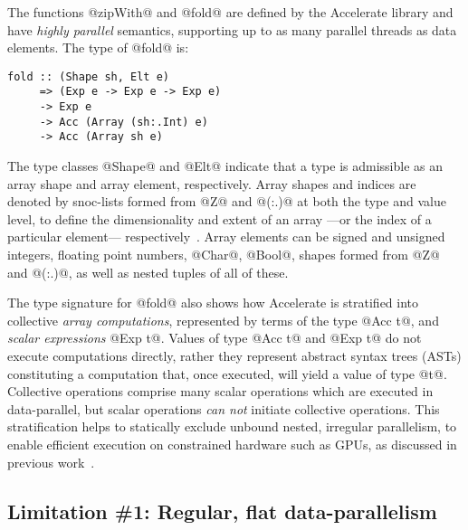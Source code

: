 The functions @zipWith@ and @fold@ are defined by the Accelerate library and
have \emph{highly parallel} semantics, supporting up to as many parallel threads as
data elements. The type of @fold@ is:
%
\begin{lstlisting}
fold :: (Shape sh, Elt e)
     => (Exp e -> Exp e -> Exp e)
     -> Exp e
     -> Acc (Array (sh:.Int) e)
     -> Acc (Array sh e)
\end{lstlisting}
%
The type classes @Shape@ and @Elt@ indicate that a type is admissible as an
array shape and array element, respectively. Array shapes and indices are
denoted by snoc-lists formed from @Z@ and @(:.)@ at both the type and value
level, to define the dimensionality and extent of an array ---or the index of a
particular element--- respectively~\citep{Keller:Repa,Chakravarty:acc-cuda}.
Array elements can be signed and unsigned integers, floating point numbers,
@Char@, @Bool@, shapes formed from @Z@ and @(:.)@, as well as nested tuples of
all of these.

The type signature for @fold@ also shows how Accelerate is stratified into
collective \emph{array computations}, represented by terms of the type @Acc t@,
and \emph{scalar expressions} @Exp t@. Values of type @Acc t@ and @Exp t@ do not
execute computations directly, rather they represent abstract syntax trees (ASTs)
constituting a computation that, once executed, will yield a value of type
@t@. Collective operations comprise many scalar operations which are executed in
data-parallel, but scalar operations \emph{can not} initiate collective
operations. This stratification helps to statically exclude unbound nested,
irregular parallelism, to enable efficient execution on constrained hardware
such as GPUs, as discussed in previous
work~\citep{Chakravarty:acc-cuda,McDonell:acc-optim,McDonell:2015:acc-llvm}.

\subsection{Limitation \#1: Regular, flat data-parallelism}
\label{sec:problem_1}

